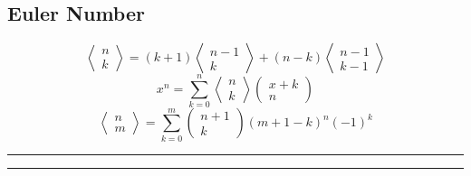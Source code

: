 \documentclass{article}
\begin{document}
\begin{multicols}{3}[
	\maketitle
    \begin{center}
        \rule{\textwidth}{2pt}
    \end{center}
]
\subsection{Euler Number}
\begin{equation*}
    \left< \substack{n\\k} \right> = (k+1) \left< \substack{n-1\\k} \right> + (n-k) \left< \substack{n-1\\k-1} \right>
\end{equation*}
\begin{equation*}
    x^n = \sum\limits_{k=0}^{n} \left< \substack{n\\k} \right> \left( \substack{x+k\\n} \right)
\end{equation*}
\begin{equation*}
    \left< \substack{n\\m} \right> = \sum\limits_{k=0}^{m} \left( \substack{n+1\\k} \right) (m+1-k)^n (-1)^k
\end{equation*}
\hrule

\end{multicols}

\begin{center}
    \rule{\textwidth}{2pt}
\end{center}
\end{document}
